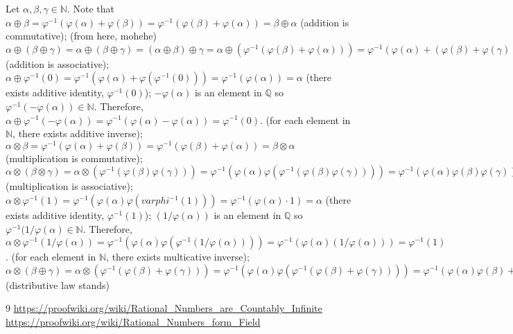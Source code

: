 \documentclass{article}
\begin{document}
\begin{itemize}
	Let $\alpha,\beta,\gamma\in\mathbb{N}$.
	Note that $\alpha \oplus \beta = \varphi^{-1} (\varphi(\alpha) + \varphi(\beta)) = \varphi^{-1} (\varphi(\beta) + \varphi(\alpha)) = \beta \oplus \alpha$ (addition is commutative); {\color{red}(from here, mohehe)} $\alpha \oplus (\beta \oplus \gamma) = \alpha \oplus (\beta \oplus \gamma) = (\alpha \oplus \beta) \oplus \gamma = \alpha \oplus (\varphi^{-1}(\varphi(\beta) + \varphi(\alpha))) = \varphi^{-1}(\varphi(\alpha) + (\varphi(\beta) + \varphi(\gamma))) = \varphi^{-1}(\varphi\varphi^{-1}(\varphi(\alpha) + \varphi(\beta)) + \varphi(\gamma)) = \varphi^{-1}(\varphi(\alpha) + \varphi(\beta)) \oplus \gamma = (\alpha \oplus \beta) \oplus \gamma$ (addition is associative); $\alpha \oplus \varphi^{-1}(0) = \varphi^{-1}(\varphi(\alpha) + \varphi(\varphi^{-1}(0))) = \varphi^{-1}(\varphi(\alpha)) = \alpha$ (there exists additive identity, $\varphi^{-1}(0)$); $-\varphi(\alpha)$ is an element in $\mathbb{Q}$ so $\varphi^{-1}(-\varphi(\alpha)) \in \mathbb{N}$. Therefore, $\alpha \oplus \varphi^{-1}(-\varphi(\alpha)) = \varphi^{-1}(\varphi(\alpha) - \varphi(\alpha)) = \varphi^{-1}(0)$. (for each element in $\mathbb{N}$, there exists additive inverse); $\alpha \otimes \beta = \varphi^{-1}(\varphi(\alpha) + \varphi(\beta)) = \varphi^{-1}(\varphi(\beta) + \varphi(\alpha)) = \beta \otimes \alpha$ (multiplication is commutative); $\alpha \otimes (\beta \otimes \gamma) = \alpha \otimes (\varphi^{-1}(\varphi(\beta)\varphi(\gamma))) = \varphi^{-1}(\varphi(\alpha)\varphi(\varphi^{-1}(\varphi(\beta)\varphi(\gamma)))) = \varphi^{-1}(\varphi(\alpha)\varphi(\beta)\varphi(\gamma)) = \varphi^{-1}(\varphi(\varphi^{-1}(\varphi(\alpha)\varphi(\beta)))\varphi(\gamma)) = \varphi^{-1}(\varphi(\alpha)\varphi(\beta)) \otimes \gamma = (\alpha \otimes \beta) \otimes \gamma$ (multiplication is associative); $\alpha \otimes \varphi^{-1}(1) = \varphi^{-1}(\varphi(\alpha)\varphi(varphi^{-1}(1))) = \varphi^{-1}(\varphi(\alpha)\cdot1) = \alpha$ (there exists additive identity, $\varphi^{-1}(1)$); $(1/\varphi(\alpha))$ is an element in $\mathbb{Q}$ so $\varphi^{-1}(1/\varphi(\alpha) \in \mathbb{N}$. Therefore, $\alpha \otimes \varphi^{-1}(1/\varphi(\alpha)) = \varphi^{-1}(\varphi(\alpha)\varphi(\varphi^{-1}(1/\varphi(\alpha)))) = \varphi^{-1}(\varphi(\alpha)(1/\varphi(\alpha))) = \varphi^{-1}(1)$. (for each element in $\mathbb{N}$, there exists multicative inverse); $\alpha \otimes (\beta \oplus \gamma) = \alpha \otimes (\varphi^{-1}(\varphi(\beta) + \varphi(\gamma))) = \varphi^{-1}(\varphi(\alpha)\varphi(\varphi^{-1}(\varphi(\beta) + \varphi(\gamma)))) = \varphi^{-1}(\varphi(\alpha)\varphi(\beta) + \varphi(\alpha)\varphi(\gamma)) = \varphi^{-1}(\varphi\varphi^{-1}(\varphi(\alpha)\varphi(\beta)) + \varphi(\alpha)\varphi(\gamma)) = \varphi^{-1}(\varphi(\alpha)\varphi(\beta)) \oplus \varphi^{-1}(\varphi(\alpha)\varphi(\gamma)) = (\alpha \otimes \beta) \oplus (\alpha \otimes \gamma)$ (distributive law stands)
\end{itemize}

\begin{thebibliography}{9}
 \url{https://proofwiki.org/wiki/Rational_Numbers_are_Countably_Infinite}
 \url{https://proofwiki.org/wiki/Rational_Numbers_form_Field}
\end{thebibliography}
\end{document}
